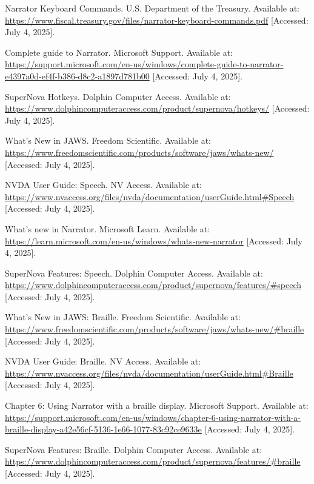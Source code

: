 \begin{thebibliography}{99}
 Narrator Keyboard Commands. U.S. Department of the Treasury. Available at: \url{https://www.fiscal.treasury.gov/files/narrator-keyboard-commands.pdf} [Accessed: July 4, 2025].

 Complete guide to Narrator. Microsoft Support. Available at: \url{https://support.microsoft.com/en-us/windows/complete-guide-to-narrator-e4397a0d-ef4f-b386-d8c2-a1897d781b00} [Accessed: July 4, 2025].

 SuperNova Hotkeys. Dolphin Computer Access. Available at: \url{https://www.dolphincomputeraccess.com/product/supernova/hotkeys/} [Accessed: July 4, 2025].

 What's New in JAWS. Freedom Scientific. Available at: \url{https://www.freedomscientific.com/products/software/jaws/whats-new/} [Accessed: July 4, 2025].

 NVDA User Guide: Speech. NV Access. Available at: \url{https://www.nvaccess.org/files/nvda/documentation/userGuide.html#Speech} [Accessed: July 4, 2025].

 What's new in Narrator. Microsoft Learn. Available at: \url{https://learn.microsoft.com/en-us/windows/whats-new-narrator} [Accessed: July 4, 2025].

 SuperNova Features: Speech. Dolphin Computer Access. Available at: \url{https://www.dolphincomputeraccess.com/product/supernova/features/#speech} [Accessed: July 4, 2025].

 What's New in JAWS: Braille. Freedom Scientific. Available at: \url{https://www.freedomscientific.com/products/software/jaws/whats-new/#braille} [Accessed: July 4, 2025].

 NVDA User Guide: Braille. NV Access. Available at: \url{https://www.nvaccess.org/files/nvda/documentation/userGuide.html#Braille} [Accessed: July 4, 2025].

 Chapter 6: Using Narrator with a braille display. Microsoft Support. Available at: \url{https://support.microsoft.com/en-us/windows/chapter-6-using-narrator-with-a-braille-display-a42e56cf-5136-1e66-1077-83c92ce9633e} [Accessed: July 4, 2025].

 SuperNova Features: Braille. Dolphin Computer Access. Available at: \url{https://www.dolphincomputeraccess.com/product/supernova/features/#braille} [Accessed: July 4, 2025].


\end{thebibliography}
